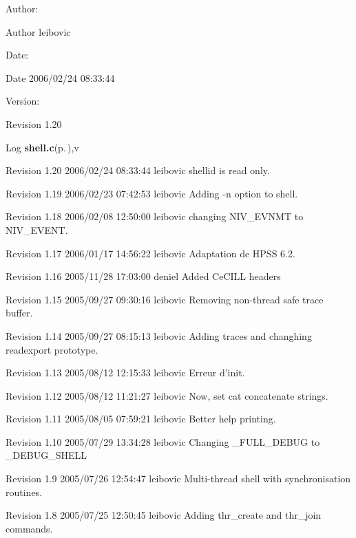 \begin{Desc}
\item[Author:]\begin{Desc}
\item[Author]leibovic \end{Desc}
\end{Desc}
\begin{Desc}
\item[Date:]\begin{Desc}
\item[Date]2006/02/24 08:33:44 \end{Desc}
\end{Desc}
\begin{Desc}
\item[Version:]\begin{Desc}
\item[Revision]1.20 \end{Desc}
\end{Desc}
\begin{Desc}
\item[Log]{\bf shell.c}{\rm (p.\,\pageref{shell_8c})},v \end{Desc}
Revision 1.20 2006/02/24 08:33:44 leibovic shellid is read only.

Revision 1.19 2006/02/23 07:42:53 leibovic Adding -n option to shell.

Revision 1.18 2006/02/08 12:50:00 leibovic changing NIV\_\-EVNMT to NIV\_\-EVENT.

Revision 1.17 2006/01/17 14:56:22 leibovic Adaptation de HPSS 6.2.

Revision 1.16 2005/11/28 17:03:00 deniel Added Ce\-CILL headers

Revision 1.15 2005/09/27 09:30:16 leibovic Removing non-thread safe trace buffer.

Revision 1.14 2005/09/27 08:15:13 leibovic Adding traces and changhing readexport prototype.

Revision 1.13 2005/08/12 12:15:33 leibovic Erreur d'init.

Revision 1.12 2005/08/12 11:21:27 leibovic Now, set cat concatenate strings.

Revision 1.11 2005/08/05 07:59:21 leibovic Better help printing.

Revision 1.10 2005/07/29 13:34:28 leibovic Changing \_\-FULL\_\-DEBUG to \_\-DEBUG\_\-SHELL

Revision 1.9 2005/07/26 12:54:47 leibovic Multi-thread shell with synchronisation routines.

Revision 1.8 2005/07/25 12:50:45 leibovic Adding thr\_\-create and thr\_\-join commands.

